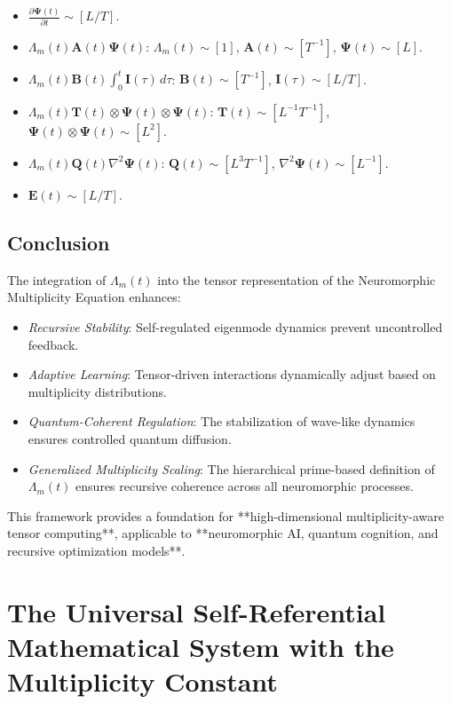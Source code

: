 \documentclass{article}
\theoremstyle{plain}
\begin{document}
\begin{itemize}
    \item \( \frac{\partial \bm{\Psi}(t)}{\partial t} \sim [L/T] \).
    \item \( \Lambda_m(t) \bm{A}(t) \bm{\Psi}(t) \): \( \Lambda_m(t) \sim [1] \), \( \bm{A}(t) \sim [T^{-1}] \), \( \bm{\Psi}(t) \sim [L] \).
    \item \( \Lambda_m(t) \bm{B}(t) \int_0^t \bm{I}(\tau) \, d\tau \): \( \bm{B}(t) \sim [T^{-1}] \), \( \bm{I}(\tau) \sim [L/T] \).
    \item \( \Lambda_m(t) \bm{T}(t) \otimes \bm{\Psi}(t) \otimes \bm{\Psi}(t) \): \( \bm{T}(t) \sim [L^{-1} T^{-1}] \), \( \bm{\Psi}(t) \otimes \bm{\Psi}(t) \sim [L^2] \).
    \item \( \Lambda_m(t) \bm{Q}(t) \nabla^2 \bm{\Psi}(t) \): \( \bm{Q}(t) \sim [L^3 T^{-1}] \), \( \nabla^2 \bm{\Psi}(t) \sim [L^{-1}] \).
    \item \( \bm{E}(t) \sim [L/T] \).
\end{itemize}

\subsection{Conclusion}

The integration of \( \Lambda_m(t) \) into the tensor representation of the Neuromorphic Multiplicity Equation enhances:

\begin{itemize}
    \item \textit{Recursive Stability}: Self-regulated eigenmode dynamics prevent uncontrolled feedback.
    \item \textit{Adaptive Learning}: Tensor-driven interactions dynamically adjust based on multiplicity distributions.
    \item \textit{Quantum-Coherent Regulation}: The stabilization of wave-like dynamics ensures controlled quantum diffusion.
    \item \textit{Generalized Multiplicity Scaling}: The hierarchical prime-based definition of \( \Lambda_m(t) \) ensures recursive coherence across all neuromorphic processes.
\end{itemize}

This framework provides a foundation for **high-dimensional multiplicity-aware tensor computing**, applicable to **neuromorphic AI, quantum cognition, and recursive optimization models**.

\section{The Universal Self-Referential Mathematical System with the Multiplicity Constant}
\end{document}
